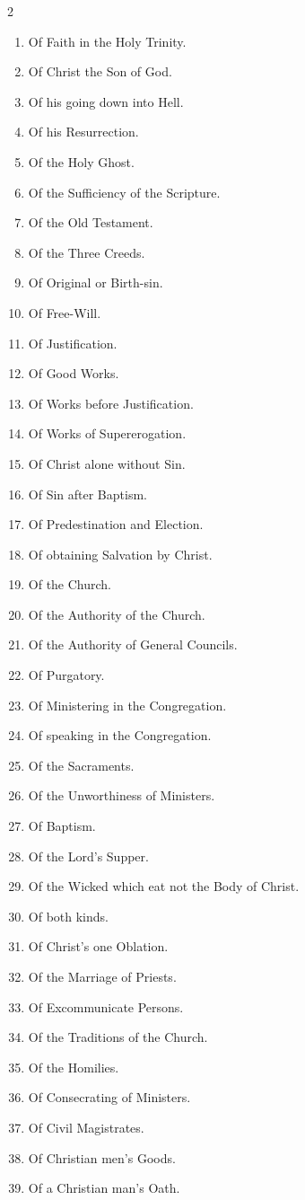 
\footnotesize
\begin{multicols}{2}
\begin{enumerate}
\item Of Faith in the Holy Trinity.
\item Of Christ the Son of God.
\item Of his going down into Hell.
\item Of his Resurrection.
\item Of the Holy Ghost.
\item Of the Sufficiency of the Scripture.
\item Of the Old Testament.
\item Of the Three Creeds.
\item Of Original or Birth-sin.
\item Of Free-Will.
\item Of Justification.
\item Of Good Works.
\item Of Works before Justification.
\item Of Works of Supererogation.
\item Of Christ alone without Sin.
\item Of Sin after Baptism.
\item Of Predestination and Election.
\item Of obtaining Salvation by Christ.
\item Of the Church.
\item Of the Authority of the Church.
\item Of the Authority of General Councils.
\item Of Purgatory.
\item Of Ministering in the Congregation.
\item Of speaking in the Congregation.
\item Of the Sacraments.
\item Of the Unworthiness of Ministers.
\item Of Baptism.
\item Of the Lord's Supper.
\item Of the Wicked which eat not the Body of Christ.
\item Of both kinds.
\item Of Christ's one Oblation.
\item Of the Marriage of Priests.
\item Of Excommunicate Persons.
\item Of the Traditions of the Church.
\item Of the Homilies.
\item Of Consecrating of Ministers.
\item Of Civil Magistrates.
\item Of Christian men's Goods.
\item Of a Christian man's Oath.
\end{enumerate}
\end{multicols}
\normalsize

